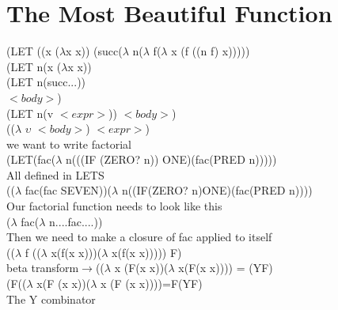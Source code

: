 \documentclass{article}
\newcommand\tab[1][1cm]{\hspace*{#1}}
\begin{document}
\cleardoublepage
\section{The Most Beautiful Function}

(LET ((x ($\lambda$x x)) (succ($\lambda$ n($\lambda$ f($\lambda$ x (f ((n f) x)))))\\

(LET n(x ($\lambda$x x))\\

(LET n(succ...))\\
\tab$< body >$)\\

(LET n(v $< expr >$)) $< body >$)\\

\tab(($\lambda$ $\upsilon$ $< body >$) $< expr >$)\\

we want to write factorial\\

(LET(fac($\lambda$ n(((IF (ZERO? n)) ONE)(fac(PRED n)))))\\

All defined in LETS\\

(($\lambda$ fac(fac SEVEN))($\lambda$ n((IF(ZERO? n)ONE)(fac(PRED n))))\\

Our factorial function needs to look like this\\
\tab($\lambda$ fac($\lambda$ n....fac....))\\

Then we need to make a closure of fac applied to itself\\

\tab(($\lambda$ f (($\lambda$ x(f(x x)))($\lambda$ x(f(x x))))) F)\\

beta transform$\rightarrow$(($\lambda$ x (F(x x))($\lambda$ x(F(x x)))) = (YF)\\

\tab(F(($\lambda$ x(F (x x))($\lambda$ x (F (x x))))=F(YF)\\

The Y combinator\\    
\end{document}
